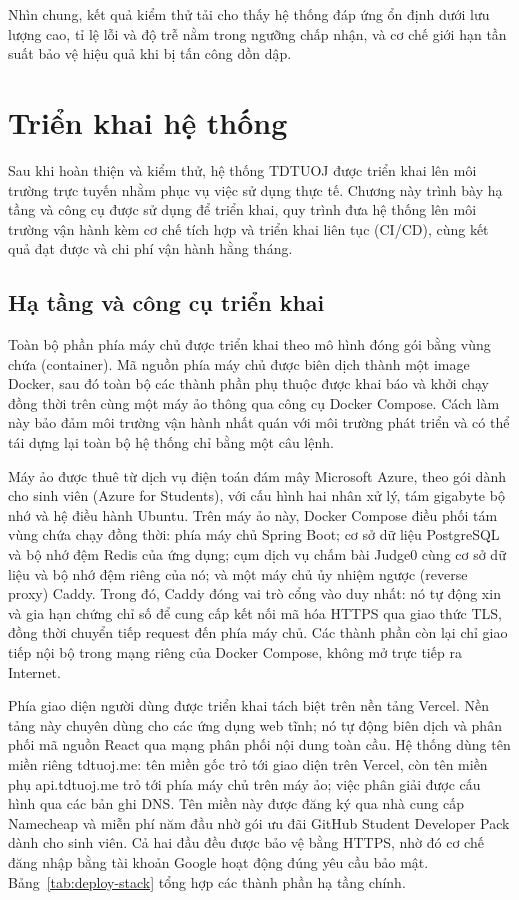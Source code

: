 \documentclass[12pt, a4paper]{report}
\begin{document}
Nhìn chung, kết quả kiểm thử tải cho thấy hệ thống đáp ứng ổn định dưới lưu lượng cao,
tỉ lệ lỗi và độ trễ nằm trong ngưỡng chấp nhận, và cơ chế giới hạn tần suất bảo vệ hiệu
quả khi bị tấn công dồn dập.

\chapter{Triển khai hệ thống}

Sau khi hoàn thiện và kiểm thử, hệ thống TDTUOJ được triển khai lên môi trường trực tuyến
nhằm phục vụ việc sử dụng thực tế. Chương này trình bày hạ tầng và công cụ
được sử dụng để triển khai, quy trình đưa hệ thống lên môi trường vận hành kèm cơ chế tích
hợp và triển khai liên tục (\ac{CI/CD}), cùng kết quả đạt được và chi phí vận hành hằng
tháng.

\section{Hạ tầng và công cụ triển khai}

Toàn bộ phần phía máy chủ được triển khai theo mô hình đóng gói bằng vùng chứa (container).
Mã nguồn phía máy chủ được biên dịch thành một image Docker, sau đó toàn bộ các thành phần
phụ thuộc được khai báo và khởi chạy đồng thời trên cùng một máy ảo thông qua
công cụ Docker Compose. Cách làm này bảo đảm môi trường vận hành nhất quán với môi trường
phát triển và có thể tái dựng lại toàn bộ hệ thống chỉ bằng một câu lệnh.

Máy ảo được thuê từ dịch vụ điện toán đám mây Microsoft Azure, theo gói dành cho sinh viên
(Azure for Students), với cấu hình hai nhân xử lý, tám gigabyte bộ nhớ và hệ điều hành Ubuntu.
Trên máy ảo này, Docker Compose điều phối tám vùng chứa chạy đồng thời: phía máy chủ Spring
Boot; cơ sở dữ liệu PostgreSQL và bộ nhớ đệm Redis của ứng dụng; cụm dịch vụ chấm bài Judge0
cùng cơ sở dữ liệu và bộ nhớ đệm riêng của nó; và một máy chủ ủy nhiệm ngược (reverse proxy)
Caddy. Trong đó, Caddy đóng vai trò cổng vào duy nhất: nó tự động xin và gia hạn chứng chỉ số
để cung cấp kết nối mã hóa \ac{HTTPS} qua giao thức \ac{TLS}, đồng thời chuyển tiếp request đến
phía máy chủ. Các thành phần còn lại chỉ giao tiếp nội bộ trong mạng riêng của Docker Compose,
không mở trực tiếp ra Internet.

Phía giao diện người dùng được triển khai tách biệt trên nền tảng Vercel. Nền tảng này chuyên
dùng cho các ứng dụng web tĩnh; nó tự động biên dịch và phân phối mã nguồn React qua mạng phân
phối nội dung toàn cầu. Hệ thống dùng tên miền riêng tdtuoj.me: tên miền gốc trỏ tới giao diện
trên Vercel, còn tên miền phụ api.tdtuoj.me trỏ tới phía máy chủ trên máy ảo; việc phân giải
được cấu hình qua các bản ghi \ac{DNS}. Tên miền này được đăng ký qua nhà cung cấp Namecheap và
miễn phí năm đầu nhờ gói ưu đãi GitHub Student Developer Pack dành cho sinh viên. Cả hai đầu đều
được bảo vệ bằng \ac{HTTPS}, nhờ đó cơ chế đăng nhập bằng tài khoản Google hoạt động đúng yêu
cầu bảo mật. Bảng~\ref{tab:deploy-stack}
tổng hợp các thành phần hạ tầng chính.
\end{document}
